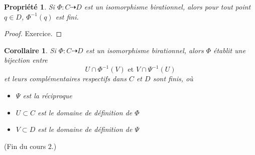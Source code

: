 \documentclass[a4paper, 11pt]{article}
\newtheorem{propriété}[théorème]{Propriété}
\newtheorem{corollaire}[théorème]{Corollaire}
\theoremstyle{definition}
\begin{document}
\begin{propriété}
  Si $\Phi : C \dashrightarrow D$ est un isomorphisme birationnel,
  alors pour tout point $q \in D$, $\Phi^{-1}(q)$ est fini.
\end{propriété}
\begin{proof}
  Exercice.
\end{proof}
\begin{corollaire}
  Si $\Phi : C \dashrightarrow D$ est un isomorphisme birationnel,
  alors $\Phi$ établit une bijection entre
  \[ U \cap \Phi^{-1}(V) \text{ et } V \cap \Psi^{-1}(U) \]
  et leurs complémentaires respectifs dans $C$ et $D$ sont finis, où
  \begin{itemize}
  \item $\Psi$ est la réciproque
  \item $U \subset C$ est le domaine de définition de $\Phi$
  \item $V \subset D$ est le domaine de définition de $\Psi$
  \end{itemize}
\end{corollaire}

(Fin du cours 2.)
\end{document}
